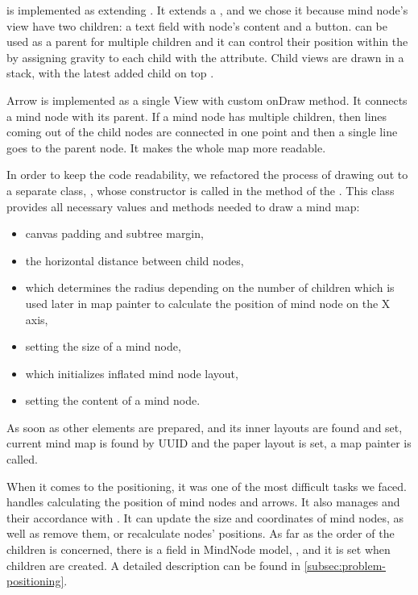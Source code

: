  is implemented as extending . It extends a , and we chose it because mind node's view have two children: a text field with node's content and a button.  can be used as a parent for multiple children and it can control their position within the  by assigning gravity to each child with the  attribute. Child views are drawn in a stack, with the latest added child on top \cite{API:2013:fl}.

Arrow is implemented as a single View with custom onDraw method. It connects a mind node with its parent. If a mind node has multiple children, then lines coming out of the child nodes are connected in one point and then a single line goes to the parent node. It makes the whole map more readable.

In order to keep the code readability, we refactored the process of drawing out to a separate class, , whose constructor is called in the  method of the . This class provides all necessary values and methods needed to draw a mind map:

\begin{itemize}
	\item canvas padding and subtree margin,
	\item the horizontal distance between child nodes,
	\item {} which determines the radius depending on the number of children which is used later in map painter to calculate the position of mind node on the X axis,
	\item {} setting the size of a mind node,
	\item {} which initializes inflated mind node layout,
	\item {} setting the content of a mind node.
\end{itemize}

As soon as other elements are prepared,  and its inner  layouts are found and set, current mind map is found by UUID and the paper layout is set, a map painter is called.

When it comes to the positioning, it was one of the most difficult tasks we faced.  handles calculating the position of mind nodes and arrows. It also manages  and their accordance with . It can update the size and coordinates of mind nodes, as well as remove them, or recalculate nodes' positions. As far as the order of the children is concerned, there is a field in MindNode model, , and it is set when children are created. A detailed description can be found in \cref{subsec:problem-positioning}.

